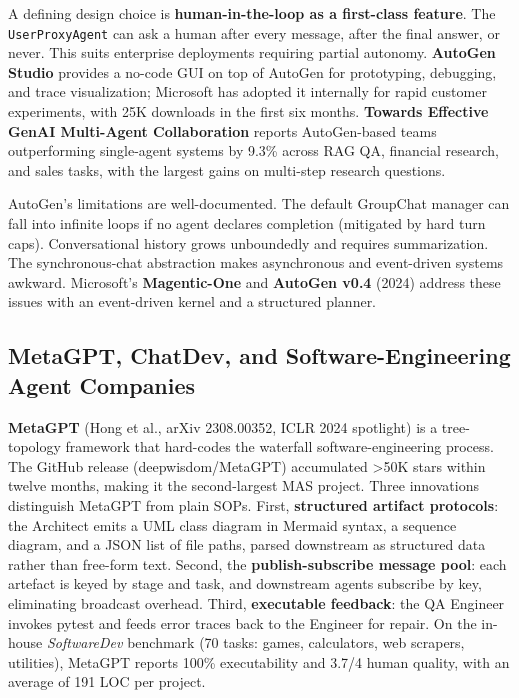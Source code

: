 \documentclass{article}
\begin{document}
A defining design choice is \textbf{human-in-the-loop as a first-class feature}. The \texttt{UserProxyAgent} can ask a human after every message, after the final answer, or never. This suits enterprise deployments requiring partial autonomy. \textbf{AutoGen Studio} \citep{dibia2024autogenstudioanoco} provides a no-code GUI on top of AutoGen for prototyping, debugging, and trace visualization; Microsoft has adopted it internally for rapid customer experiments, with 25K downloads in the first six months. \textbf{Towards Effective GenAI Multi-Agent Collaboration} \citep{shu2024towardseffectivege} reports AutoGen-based teams outperforming single-agent systems by 9.3\% across RAG QA, financial research, and sales tasks, with the largest gains on multi-step research questions.

AutoGen's limitations are well-documented. The default GroupChat manager can fall into infinite loops if no agent declares completion (mitigated by hard turn caps). Conversational history grows unboundedly and requires summarization. The synchronous-chat abstraction makes asynchronous and event-driven systems awkward. Microsoft's \textbf{Magentic-One} and \textbf{AutoGen v0.4} (2024) address these issues with an event-driven kernel and a structured planner.

\subsection{MetaGPT, ChatDev, and Software-Engineering Agent Companies}\label{metagpt-chatdev-and-software-engineering-agent-companies}

\textbf{MetaGPT} (Hong et al., arXiv 2308.00352, ICLR 2024 spotlight) is a tree-topology framework that hard-codes the waterfall software-engineering process. The GitHub release (deepwisdom/MetaGPT) accumulated \textgreater50K stars within twelve months, making it the second-largest MAS project. Three innovations distinguish MetaGPT from plain SOPs. First, \textbf{structured artifact protocols}: the Architect emits a UML class diagram in Mermaid syntax, a sequence diagram, and a JSON list of file paths, parsed downstream as structured data rather than free-form text. Second, the \textbf{publish-subscribe message pool}: each artefact is keyed by stage and task, and downstream agents subscribe by key, eliminating broadcast overhead. Third, \textbf{executable feedback}: the QA Engineer invokes pytest and feeds error traces back to the Engineer for repair. On the in-house \emph{SoftwareDev} benchmark (70 tasks: games, calculators, web scrapers, utilities), MetaGPT reports 100\% executability and 3.7/4 human quality, with an average of 191 LOC per project.
\end{document}
